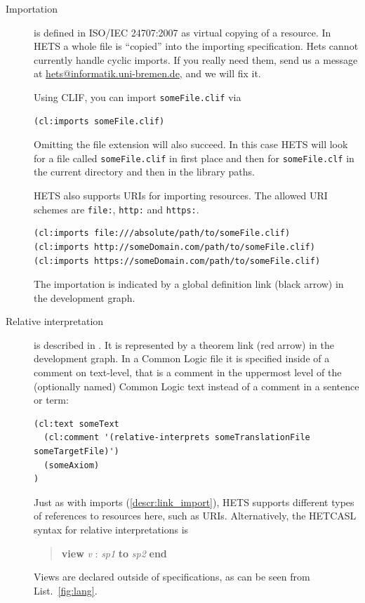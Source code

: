 \documentclass{article}
\newcommand{\normalTEXTSC}[2]{{#1\scriptsize#2}}
\newcommand     {\Hets}{\normalTEXTSC{H}{ETS}\xspace}
\newcommand{\HetCASL}{\normalTEXTSC{H}{ET}\normalTEXTSC{C}{ASL}\xspace}
\begin{document}
\begin{description}
\item[Importation] \label{descr:link_import}
  is defined in ISO/IEC 24707:2007 \cite{iso24a} as virtual copying of a 
  resource. In \Hets a whole file is ``copied'' into the importing  
  specification. Hets cannot currently handle cyclic imports. If you really need
  them, send us a message at \href{mailto:hets@informatik.uni-bremen.de}{hets@informatik.uni-bremen.de}, and we will fix it.
  
  Using CLIF, you can import \texttt{someFile.clif} via
  \begin{lstlisting}[language=clif]
(cl:imports someFile.clif)
  \end{lstlisting}
  Omitting the file extension will also succeed. In this case \Hets will look 
  for a file called \texttt{someFile.clif} in first place and then for 
  \texttt{someFile.clf} in the current directory and then in the library paths.

  \Hets also supports URIs for importing resources. The allowed URI schemes are
  \texttt{file:}, \texttt{http:} and \texttt{https:}.
  \begin{lstlisting}[language=clif]
(cl:imports file:///absolute/path/to/someFile.clif)
(cl:imports http://someDomain.com/path/to/someFile.clif)
(cl:imports https://someDomain.com/path/to/someFile.clif)
  \end{lstlisting}

  The importation is indicated by a global definition link (black arrow) in the 
  development graph.

\item[Relative interpretation]
  is described in \cite{colore-fois}. It is represented by a theorem link 
  (red arrow) in the development graph. In a Common Logic file it is specified 
  inside of a comment on text-level, that is a comment in the uppermost level 
  of the (optionally named) Common Logic text instead of a comment in a sentence or 
  term:
  
  \begin{lstlisting}[language=clif]
(cl:text someText
  (cl:comment '(relative-interprets someTranslationFile someTargetFile)')
  (someAxiom)
)
  \end{lstlisting}
  Just as with imports (\ref{descr:link_import}), \Hets supports different types 
  of references to resources here, such as URIs.
  Alternatively, the \HetCASL syntax for relative interpretations is
\begin{quote}
\textbf{view} \textit{v} : \textit{sp1} \textbf{to} \textit{sp2} \textbf{end}
\end{quote}
  Views are declared outside of specifications, as can be seen from List.~\ref{fig:lang}.
  

\end{description}
\end{document}
